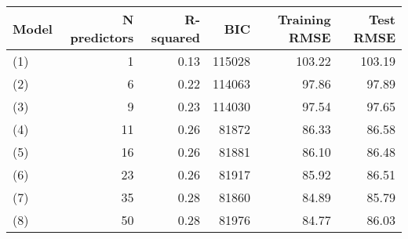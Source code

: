 \begin{tabular}{lrrrrr}
  \toprule
Model & N predictors & R-squared & BIC & Training RMSE & Test RMSE \\ 
  \midrule
(1) & 1 & 0.13 & 115028 & 103.22 & 103.19 \\ 
  (2) & 6 & 0.22 & 114063 & 97.86 & 97.89 \\ 
  (3) & 9 & 0.23 & 114030 & 97.54 & 97.65 \\ 
  (4) & 11 & 0.26 & 81872 & 86.33 & 86.58 \\ 
  (5) & 16 & 0.26 & 81881 & 86.10 & 86.48 \\ 
  (6) & 23 & 0.26 & 81917 & 85.92 & 86.51 \\ 
  (7) & 35 & 0.28 & 81860 & 84.89 & 85.79 \\ 
  (8) & 50 & 0.28 & 81976 & 84.77 & 86.03 \\ 
   \bottomrule
\end{tabular}
